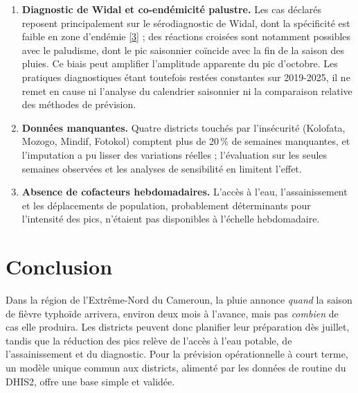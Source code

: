 \documentclass[11pt]{article}
\begin{document}
\begin{enumerate}[label=\arabic*.,leftmargin=1.6em]
\item \textbf{Diagnostic de Widal et co-endémicité palustre.} Les cas déclarés reposent principalement sur le sérodiagnostic de Widal, dont la spécificité est faible en zone d'endémie [\hyperlink{ref3}{3}] ; des réactions croisées sont notamment possibles avec le paludisme, dont le pic saisonnier coïncide avec la fin de la saison des pluies. Ce biais peut amplifier l'amplitude apparente du pic d'octobre. Les pratiques diagnostiques étant toutefois restées constantes sur 2019-2025, il ne remet en cause ni l'analyse du calendrier saisonnier ni la comparaison relative des méthodes de prévision.
\item \textbf{Données manquantes.} Quatre districts touchés par l'insécurité (Kolofata, Mozogo, Mindif, Fotokol) comptent plus de 20\,\% de semaines manquantes, et l'imputation a pu lisser des variations réelles ; l'évaluation sur les seules semaines observées et les analyses de sensibilité en limitent l'effet.
\item \textbf{Absence de cofacteurs hebdomadaires.} L'accès à l'eau, l'assainissement et les déplacements de population, probablement déterminants pour l'intensité des pics, n'étaient pas disponibles à l'échelle hebdomadaire.
\end{enumerate}

\section{Conclusion}
Dans la région de l'Extrême-Nord du Cameroun, la pluie annonce \textit{quand} la saison de fièvre typhoïde arrivera, environ deux mois à l'avance, mais pas \textit{combien} de cas elle produira. Les districts peuvent donc planifier leur préparation dès juillet, tandis que la réduction des pics relève de l'accès à l'eau potable, de l'assainissement et du diagnostic. Pour la prévision opérationnelle à court terme, un modèle unique commun aux districts, alimenté par les données de routine du DHIS2, offre une base simple et validée.
\end{document}

